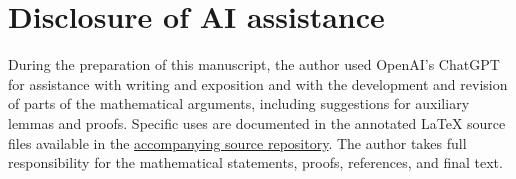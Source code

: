\documentclass[11pt,a4paper]{amsart}
\numberwithin{equation}{section}
\theoremstyle{plain}
\theoremstyle{definition}
\theoremstyle{remark}
\begin{document}
\section*{Disclosure of AI assistance}
During the preparation of this manuscript, the author used
OpenAI's ChatGPT for assistance with writing and exposition
and with the development and revision of parts of the
mathematical arguments, including suggestions for auxiliary
lemmas and proofs. Specific uses are documented in the
annotated LaTeX source files available in the
\href{https://github.com/alexanderczernik/alexanderczernik.github.io/blob/dee787a89a7c0ef80735113e041fa398cd73a694/assets/files/uniqueness_manuscript}
{accompanying source repository}.
The author takes full responsibility for the mathematical
statements, proofs, references, and final text.

\printbibliography
\end{document}

